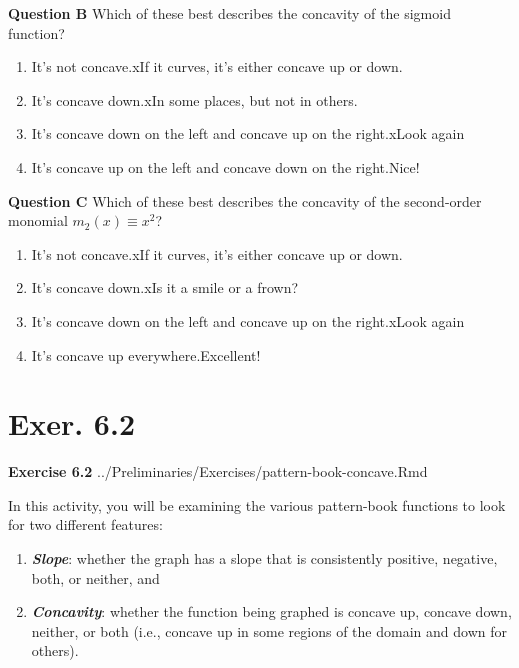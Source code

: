 \documentclass[
  letterpaper,
  DIV=11,
  numbers=noendperiod,
  oneside]{article}
\providecommand{\tightlist}{%
  \setlength{\itemsep}{0pt}\setlength{\parskip}{0pt}}\usepackage{longtable,booktabs,array}
\begin{document}
\begin{multicols}{2}
\textbf{Question B} Which of these best describes the concavity of the
sigmoid function?

\begin{enumerate}
\def\labelenumi{\roman{enumi}.}
\tightlist
\item
  {It's not concave.{xIf it curves, it's either concave up or
  down.}}\\
\item
  {It's concave down.{xIn some places, but not in others.}}\\
\item
  {It's concave down on the left and concave up on the right.{xLook
  again}}\\
\item
  {It's concave up on the left and concave down on the right.{Nice!~}}
\end{enumerate}

\textbf{Question C} Which of these best describes the concavity of the
second-order monomial \(m_2(x) \equiv x^2\)?

\begin{enumerate}
\def\labelenumi{\roman{enumi}.}
\tightlist
\item
  {It's not concave.{xIf it curves, it's either concave up or
  down.}}\\
\item
  {It's concave down.{xIs it a smile or a frown?}}\\
\item
  {It's concave down on the left and concave up on the right.{xLook
  again}}\\
\item
  {It's concave up everywhere.{Excellent!~}}
\end{enumerate}

\hypertarget{exer.-6.2}{%
\section*{Exer. 6.2}\label{exer.-6.2}}

\textbf{Exercise 6.2}
../Preliminaries/Exercises/pattern-book-concave.Rmd

In this activity, you will be examining the various pattern-book
functions to look for two different features:

\begin{enumerate}
\def\labelenumi{\arabic{enumi}.}
\tightlist
\item
  \textbf{\emph{Slope}}: whether the graph has a slope that is
  consistently positive, negative, both, or neither, and
\item
  \textbf{\emph{Concavity}}: whether the function being graphed is
  concave up, concave down, neither, or both (i.e., concave up in some
  regions of the domain and down for others).
\end{enumerate}


\end{multicols}
\end{document}
